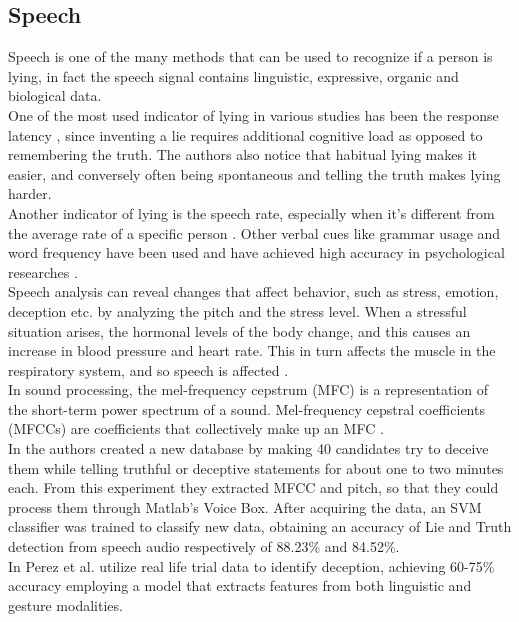 \subsection*{Speech}
Speech is one of the many methods that can be used to recognize if a person is lying, in fact the speech signal contains linguistic, expressive, organic and biological data. \cite{norena}\\
One of the most used indicator of lying in various studies has been the response latency \cite{EaseLying}, since inventing a lie requires additional cognitive load as opposed to remembering the truth. The authors also notice that habitual lying makes it easier, and conversely often being spontaneous and telling the truth makes lying harder.\\
Another indicator of lying is the speech rate, especially when it's different from the average rate of a specific person \cite{TemporalCues}. Other verbal cues like grammar usage and word frequency have been used and have achieved high accuracy in psychological researches \cite{PorterTruthLying}.\\
Speech analysis can reveal changes that affect behavior, such as stress, emotion, deception etc. by analyzing the pitch and the stress level. When a stressful situation arises, the hormonal levels of the body change, and this causes an increase in blood pressure and heart rate. This in turn affects the muscle in the respiratory system, and so speech is affected \cite{norena}. \\
In sound processing, the mel-frequency cepstrum (MFC) is a representation of the short-term power spectrum of a sound. Mel-frequency cepstral coefficients (MFCCs) are coefficients that collectively make up an MFC \cite{wiki:mfcc}. \\
In \cite{relidss} the authors created a new database by making 40 candidates try to deceive them while telling truthful or deceptive statements for about one to two minutes each. From this experiment they extracted MFCC and pitch, so that they could process them through Matlab's Voice Box. After acquiring the data, an SVM classifier was trained to classify new data, obtaining an accuracy of Lie and Truth detection from speech audio respectively of 88.23\% and 84.52\%. \\
In \cite{Perez-Rosas:2015:DDU:2818346.2820758} \cite{Mihalcea:2013:ADD:2522848.2522888} Perez et al. utilize real life trial data to identify deception, achieving 60-75\% accuracy employing a model that extracts features from both linguistic and gesture modalities.
 
